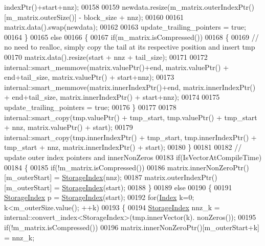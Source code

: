 \begin{DoxyCode}
      indexPtr()+start+nnz);
00158 
00159         newdata.resize(m\_matrix.outerIndexPtr()[m\_matrix.outerSize()] - block\_size + nnz);
00160 
00161         matrix.data().swap(newdata);
00162 
00163         update\_trailing\_pointers = \textcolor{keyword}{true};
00164       \}
00165       \textcolor{keywordflow}{else}
00166       \{
00167         \textcolor{keywordflow}{if}(m\_matrix.isCompressed())
00168         \{
00169           \textcolor{comment}{// no need to realloc, simply copy the tail at its respective position and insert tmp}
00170           matrix.data().resize(start + nnz + tail\_size);
00171 
00172           internal::smart\_memmove(matrix.valuePtr()+end,      matrix.valuePtr() + end+tail\_size,      
      matrix.valuePtr() + start+nnz);
00173           internal::smart\_memmove(matrix.innerIndexPtr()+end, matrix.innerIndexPtr() + end+tail\_size, 
      matrix.innerIndexPtr() + start+nnz);
00174 
00175           update\_trailing\_pointers = \textcolor{keyword}{true};
00176         \}
00177 
00178         internal::smart\_copy(tmp.valuePtr() + tmp\_start,      tmp.valuePtr() + tmp\_start + nnz,       
      matrix.valuePtr() + start);
00179         internal::smart\_copy(tmp.innerIndexPtr() + tmp\_start, tmp.innerIndexPtr() + tmp\_start + nnz,  
      matrix.innerIndexPtr() + start);
00180       \}
00181 
00182       \textcolor{comment}{// update outer index pointers and innerNonZeros}
00183       \textcolor{keywordflow}{if}(IsVectorAtCompileTime)
00184       \{
00185         \textcolor{keywordflow}{if}(!m\_matrix.isCompressed())
00186           matrix.innerNonZeroPtr()[m\_outerStart] = \hyperlink{group___sparse_core___module_a0b540ba724726ebe953f8c0df06081ed}{StorageIndex}(nnz);
00187         matrix.outerIndexPtr()[m\_outerStart] = \hyperlink{group___sparse_core___module_a0b540ba724726ebe953f8c0df06081ed}{StorageIndex}(start);
00188       \}
00189       \textcolor{keywordflow}{else}
00190       \{
00191         \hyperlink{group___sparse_core___module_a0b540ba724726ebe953f8c0df06081ed}{StorageIndex} p = \hyperlink{group___sparse_core___module_a0b540ba724726ebe953f8c0df06081ed}{StorageIndex}(start);
00192         \textcolor{keywordflow}{for}(\hyperlink{group___core___module_a554f30542cc2316add4b1ea0a492ff02}{Index} k=0; k<m\_outerSize.value(); ++k)
00193         \{
00194           \hyperlink{group___sparse_core___module_a0b540ba724726ebe953f8c0df06081ed}{StorageIndex} nnz\_k = internal::convert\_index<StorageIndex>(tmp.innerVector(k).
      nonZeros());
00195           \textcolor{keywordflow}{if}(!m\_matrix.isCompressed())
00196             matrix.innerNonZeroPtr()[m\_outerStart+k] = nnz\_k;

\end{DoxyCode}
